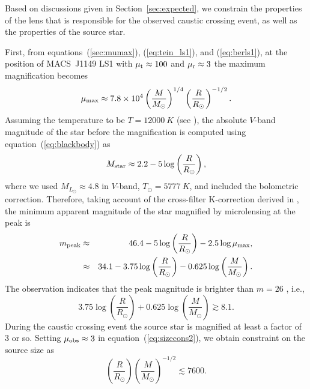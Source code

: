 \documentclass[showpacs,twocolumn,preprintnumbers,amsmath,amssymb,superscriptaddress,nofootinbib]{revtex4}
\begin{document}
Based on discussions given in Section~\ref{sec:expected}, we constrain
the properties of the lens that is responsible for the observed caustic
crossing event, as well as the properties of the source star.

First, from equations~(\ref{sec:mumax}), (\ref{eq:tein_ls1}), and
(\ref{eq:berls1}), at the position of MACS~J1149 LS1 with
 $\mu_{\rm t}\approx 100$ and $\mu_{\rm r}\approx 3$ the maximum
magnification becomes  
\begin{equation}
\mu_{\rm max}\approx 7.8\times 10^4\left(\frac{M}{M_\odot}\right)^{1/4}
\left(\frac{R}{R_\odot}\right)^{-1/2}.
\label{eq:mumax_ls1}
\end{equation}
Assuming the temperature to be $T=12000~K$ (see \cite{Kelly:2017fps}),
the absolute $V$-band magnitude of the star before the magnification
is computed using equation~(\ref{eq:blackbody}) as
\begin{equation}
M_{\rm star}\approx 2.2-5\log\left(\frac{R}{R_\odot}\right),
\end{equation}
where we used $M_{L_\odot}\approx 4.8$ in $V$-band, $T_\odot=5777~K$,
and included the bolometric correction. Therefore, taking account of
the cross-filter K-correction derived in \cite{Kelly:2017fps}, the
minimum apparent magnitude of the star magnified by microlensing at
the peak is 
\begin{eqnarray}
m_{\rm peak}&\approx&46.4-5\log\left(\frac{R}{R_\odot}\right)-2.5\log\mu_{\rm
  max},\nonumber\\
&\approx& 34.1-3.75\log\left(\frac{R}{R_\odot}\right)-0.625
\log\left(\frac{M}{M_\odot}\right).
\label{eq:mmin}
\end{eqnarray}
The observation indicates that the peak magnitude is brighter than
$m=26$ \cite{Kelly:2017fps}, i.e.,  
\begin{equation}
3.75\log\left(\frac{R}{R_\odot}\right)+0.625
\log\left(\frac{M}{M_\odot}\right)\gtrsim 8.1.
\label{eq:const1}
\end{equation}
During the caustic crossing event the source star is magnified at
least a factor of 3 or so. Setting $\mu_{\rm obs}\approx 3$ in
equation~(\ref{eq:sizecons2}), we obtain constraint on the source size
as 
\begin{equation}
\left(\frac{R}{R_\odot}\right)\left(\frac{M}{M_\odot}\right)^{-1/2}
\lesssim 7600.
\label{eq:const2}
\end{equation}
\end{document}
